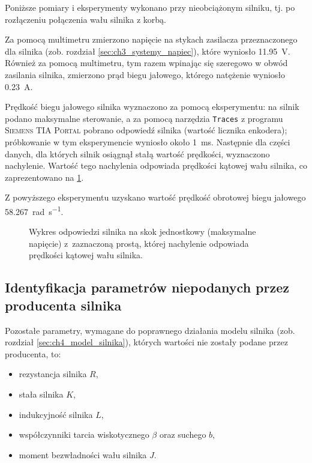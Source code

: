 Poniższe pomiary i eksperymenty wykonano przy nieobciążonym silniku, tj. po rozłączeniu połączenia wału silnika z korbą.

Za pomocą multimetru zmierzono napięcie na stykach zasilacza przeznaczonego dla silnika (zob. rozdział \ref{sec:ch3_systemy_napiec}), które wyniosło \SI{11,95}{\volt}. Również za pomocą multimetru, tym razem wpinając się szeregowo w obwód zasilania silnika, zmierzono prąd biegu jałowego, którego natężenie wyniosło \SI{0,23}{\ampere}.

Prędkość biegu jałowego silnika wyznaczono za pomocą eksperymentu: na silnik podano maksymalne sterowanie, a za pomocą narzędzia \texttt{Traces} z programu \textsc{Siemens TIA Portal} pobrano odpowiedź silnika (wartość licznika enkodera); próbkowanie w tym eksperymencie wyniosło około \SI{1}{\milli\second}. Następnie dla części danych, dla których silnik osiągnął stałą wartość prędkości, wyznaczono nachylenie. Wartość tego nachylenia odpowiada prędkości kątowej wału silnika, co zaprezentowano na \cref{fig:odpowiedz_silnika_na_maksymalny_skok_jednostkowy}.

Z powyższego eksperymentu uzyskano wartość prędkość obrotowej biegu jałowego \SI{58,267}{\radian\per\second}.

\begin{figure}[h]
    \centering
    
    \caption{Wykres odpowiedzi silnika na skok jednostkowy (maksymalne napięcie) z~zaznaczoną prostą, której nachylenie odpowiada prędkości kątowej wału silnika.}
    \label{fig:odpowiedz_silnika_na_maksymalny_skok_jednostkowy}
\end{figure}

\subsection{Identyfikacja parametrów niepodanych przez producenta silnika}
\label{subsec:ch5_identyfikacja_parametrow_niepodanych_przez_producenta_silnika}

Pozostałe parametry, wymagane do poprawnego działania modelu silnika (zob. rozdział \ref{sec:ch4_model_silnika}), których wartości nie zostały podane przez producenta, to:

\begin{itemize}
    \item rezystancja silnika $R$,
    \item stała silnika $K$,
    \item indukcyjność silnika $L$,
    \item współczynniki tarcia wiskotycznego $\beta$ oraz suchego $b$,
    \item moment bezwładności wału silnika $J$.
\end{itemize}

